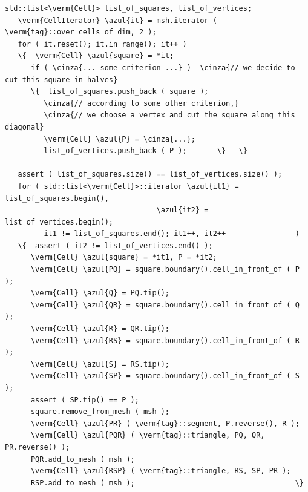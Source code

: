 \begin{Verbatim}[commandchars=\\\{\},formatcom=\small\tt,frame=single,
   label=parag-\ref{\numb section 10.\numb parag 3}.cpp,rulecolor=\color{coment},
   baselinestretch=0.94,framesep=2mm]
   std::list<\verm{Cell}> list_of_squares, list_of_vertices;
   \verm{CellIterator} \azul{it} = msh.iterator ( \verm{tag}::over_cells_of_dim, 2 );
   for ( it.reset(); it.in_range(); it++ )
   \{  \verm{Cell} \azul{square} = *it;
      if ( \cinza{... some criterion ...} )  \cinza{// we decide to cut this square in halves}
      \{  list_of_squares.push_back ( square );
         \cinza{// according to some other criterion,}
         \cinza{// we choose a vertex and cut the square along this diagonal}
         \verm{Cell} \azul{P} = \cinza{...};  
         list_of_vertices.push_back ( P );       \}   \}

   assert ( list_of_squares.size() == list_of_vertices.size() );
   for ( std::list<\verm{Cell}>::iterator \azul{it1} = list_of_squares.begin(),
                                   \azul{it2} = list_of_vertices.begin();
         it1 != list_of_squares.end(); it1++, it2++                )
   \{  assert ( it2 != list_of_vertices.end() );
      \verm{Cell} \azul{square} = *it1, P = *it2;
      \verm{Cell} \azul{PQ} = square.boundary().cell_in_front_of ( P );
      \verm{Cell} \azul{Q} = PQ.tip();
      \verm{Cell} \azul{QR} = square.boundary().cell_in_front_of ( Q );
      \verm{Cell} \azul{R} = QR.tip();
      \verm{Cell} \azul{RS} = square.boundary().cell_in_front_of ( R );
      \verm{Cell} \azul{S} = RS.tip();
      \verm{Cell} \azul{SP} = square.boundary().cell_in_front_of ( S );
      assert ( SP.tip() == P );
      square.remove_from_mesh ( msh );
      \verm{Cell} \azul{PR} ( \verm{tag}::segment, P.reverse(), R );
      \verm{Cell} \azul{PQR} ( \verm{tag}::triangle, PQ, QR, PR.reverse() );
      PQR.add_to_mesh ( msh );
      \verm{Cell} \azul{RSP} ( \verm{tag}::triangle, RS, SP, PR );
      RSP.add_to_mesh ( msh );                                     \}
\end{Verbatim}
